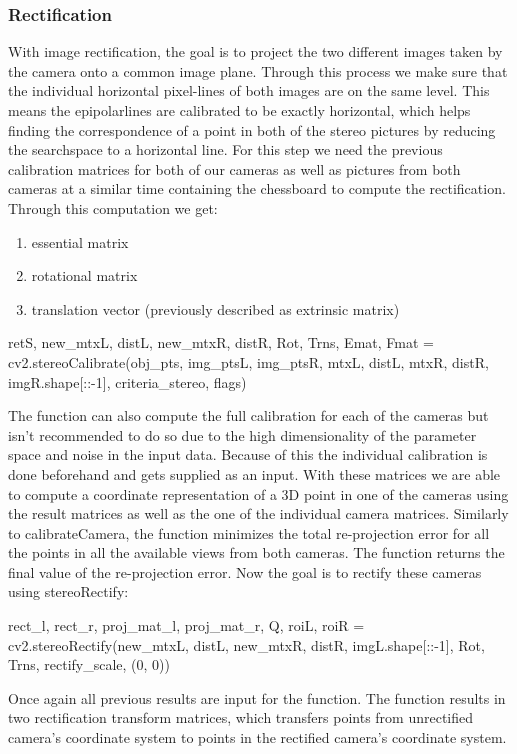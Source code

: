\documentclass[journal,onecolumn]{IEEEtran}
\begin{document}
\subsubsection{Rectification}
\noindent
With image rectification, the goal is to project the two different images taken by the camera onto a common image plane. Through this process we make sure that the individual horizontal pixel-lines of both images are on the same level. This means the epipolarlines are calibrated to be exactly horizontal, which helps finding the correspondence of a point in both of the stereo pictures by reducing the searchspace to a horizontal line.
For this step we need the previous calibration matrices for both of our cameras as well as pictures from both cameras at a similar time containing the chessboard to compute the rectification. Through this computation we get:
\begin{enumerate}
	\item essential matrix
	\item rotational matrix
	\item translation vector (previously described as extrinsic matrix) %
\end{enumerate}

\begin{python}
retS, new_mtxL, distL, new_mtxR, distR, Rot, Trns, Emat, Fmat = cv2.stereoCalibrate(obj_pts,
 										img_ptsL,
 										img_ptsR,
 										mtxL, distL,
 										mtxR, distR,
 										imgR.shape[::-1],
 										criteria_stereo,
 										flags)
\end{python}
The function can also compute the full calibration for each of the cameras but isn't recommended to do so due to the high dimensionality of the parameter space and noise in the input data\cite{stereoCalibrate}. Because of this the individual calibration is done beforehand and gets supplied as an input.
With these matrices we are able to compute a coordinate representation of a 3D point in one of the cameras using the result matrices as well as the one of the individual camera matrices.
Similarly to calibrateCamera, the function minimizes the total re-projection error for all the points in all the available views from both cameras. The function returns the final value of the re-projection error.
Now the goal is to rectify these cameras using stereoRectify:
\begin{python}
rect_l, rect_r, proj_mat_l, proj_mat_r, Q, roiL, roiR = cv2.stereoRectify(new_mtxL, 
 										distL, 
 										new_mtxR, 
 										distR,
 										imgL.shape[::-1],
  										Rot, Trns,
  										rectify_scale,
 										(0, 0))
\end{python}
Once again all previous results are input for the function. The function results in two rectification transform matrices, which transfers points from unrectified camera's coordinate system to points in the rectified camera's coordinate system.
\end{document}
